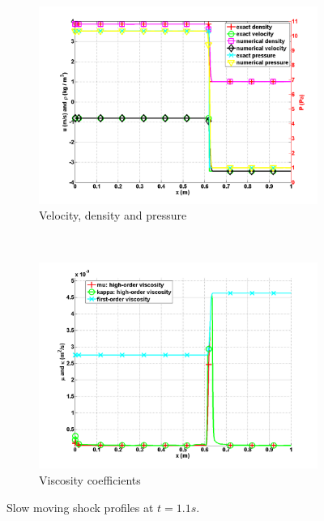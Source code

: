 \documentclass[review,10pt]{elsarticle}
\begin{document}
\begin{figure}[H]
        \centering
        \begin{subfigure}[b]{0.75\textwidth}
                \centering
                \includegraphics[width=\textwidth]{figures/SlowMovingShock_density_velocity_pressure_profiles.png}
                \caption{Velocity, density and pressure}
                \label{fig:profiles_sms}
        \end{subfigure}\\
        \begin{subfigure}[b]{0.75\textwidth}
                \centering
                \includegraphics[width=\textwidth]{figures/SlowMovingShock_viscosity.png}
                \caption{Viscosity coefficients}
                \label{fig:viscosity_sms}
        \end{subfigure} 
        \caption{Slow moving shock profiles at $t=1.1s$.}\label{fig:low_moving_shock}
\end{figure} 
\end{document}
